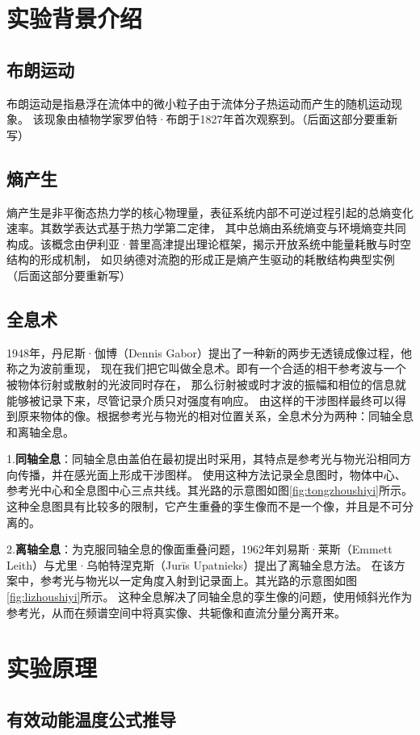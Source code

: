 \documentclass[a4paper]{report}
\begin{document}
\tableofcontents

\chapter{实验背景介绍}
\section{布朗运动}
布朗运动是指悬浮在流体中的微小粒子由于流体分子热运动而产生的随机运动现象。
该现象由植物学家罗伯特·布朗于1827年首次观察到。（后面这部分要重新写）
\section{熵产生}
熵产生是非平衡态热力学的核心物理量，表征系统内部不可逆过程引起的总熵变化速率。其数学表达式基于热力学第二定律，
其中总熵由系统熵变与环境熵变共同构成。该概念由伊利亚·普里高津提出理论框架，揭示开放系统中能量耗散与时空结构的形成机制，
如贝纳德对流胞的形成正是熵产生驱动的耗散结构典型实例（后面这部分要重新写）
\section{全息术}
1948年，丹尼斯·伽博（Dennis Gabor）提出了一种新的两步无透镜成像过程，他称之为波前重现，
现在我们把它叫做全息术\cite{goodman}。即有一个合适的相干参考波与一个被物体衍射或散射的光波同时存在，
那么衍射被或时才波的振幅和相位的信息就能够被记录下来，尽管记录介质只对强度有响应。
由这样的干涉图样最终可以得到原来物体的像。根据参考光与物光的相对位置关系，全息术分为两种：同轴全息和离轴全息。

1.\textbf{同轴全息}：同轴全息由盖伯在最初提出时采用，其特点是参考光与物光沿相同方向传播，并在感光面上形成干涉图样。
使用这种方法记录全息图时，物体中心、参考光中心和全息图中心三点共线。其光路的示意图如图\ref{fig:tongzhoushiyi}\cite{shuzi1}所示。
这种全息图具有比较多的限制，它产生重叠的孪生像而不是一个像，并且是不可分离的。

2.\textbf{离轴全息}：为克服同轴全息的像面重叠问题，1962年刘易斯·莱斯（Emmett Leith）与尤里·乌帕特涅克斯（Jurīs Upatnieks）提出了离轴全息方法。
在该方案中，参考光与物光以一定角度入射到记录面上。其光路的示意图如图\ref{fig:lizhoushiyi}\cite{shuzi1}所示。
这种全息解决了同轴全息的孪生像的问题，使用倾斜光作为参考光，从而在频谱空间中将真实像、共轭像和直流分量分离开来。

\chapter{实验原理}
\section{有效动能温度公式推导}
\end{document}
